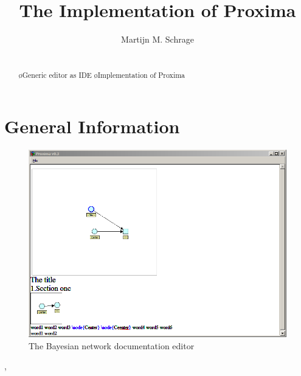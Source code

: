 \documentclass[12pt]{article}
\title{The Implementation of Proxima \\{\small \version}}
\author{Martijn M. Schrage\inst{1}}
\begin{document}
 

\maketitle

\begin{abstract}

~\\ \bl
\o Generic editor as IDE
\o Implementation of Proxima 
\el

\end{abstract}
     


\section{General Information}



\begin{figure}[ht]
\centering
\includegraphics[width=\textwidth]{images/screenshots/BayesDocEditor}
\caption{The Bayesian network documentation editor}
\label{fig:exampleFig1}
\end{figure}




\cite{schrage04Proxima},



\end{document}
